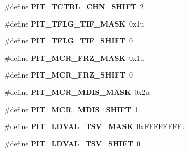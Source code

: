 \begin{DoxyCompactItemize}
\item 
\#define {\bfseries P\+I\+T\+\_\+\+T\+C\+T\+R\+L\+\_\+\+C\+H\+N\+\_\+\+S\+H\+I\+FT}~2\hypertarget{group__PIT__Register__Masks_ga9a1c8aa25a05c9b2c9503a003fa8d24d}{}\label{group__PIT__Register__Masks_ga9a1c8aa25a05c9b2c9503a003fa8d24d}

\item 
\#define {\bfseries P\+I\+T\+\_\+\+T\+F\+L\+G\+\_\+\+T\+I\+F\+\_\+\+M\+A\+SK}~0x1u\hypertarget{group__PIT__Register__Masks_ga9de8d708b43c9ca35df26c7b43f09769}{}\label{group__PIT__Register__Masks_ga9de8d708b43c9ca35df26c7b43f09769}

\item 
\#define {\bfseries P\+I\+T\+\_\+\+T\+F\+L\+G\+\_\+\+T\+I\+F\+\_\+\+S\+H\+I\+FT}~0\hypertarget{group__PIT__Register__Masks_gaf6f5ddca2193ed04bc61bc3e899f5ced}{}\label{group__PIT__Register__Masks_gaf6f5ddca2193ed04bc61bc3e899f5ced}

\item 
\#define {\bfseries P\+I\+T\+\_\+\+M\+C\+R\+\_\+\+F\+R\+Z\+\_\+\+M\+A\+SK}~0x1u\hypertarget{group__PIT__Register__Masks_ga8149a0bb21843632dd4528b540480ba7}{}\label{group__PIT__Register__Masks_ga8149a0bb21843632dd4528b540480ba7}

\item 
\#define {\bfseries P\+I\+T\+\_\+\+M\+C\+R\+\_\+\+F\+R\+Z\+\_\+\+S\+H\+I\+FT}~0\hypertarget{group__PIT__Register__Masks_ga500ccd29eaebc20aa853e7bbb23e3c0c}{}\label{group__PIT__Register__Masks_ga500ccd29eaebc20aa853e7bbb23e3c0c}

\item 
\#define {\bfseries P\+I\+T\+\_\+\+M\+C\+R\+\_\+\+M\+D\+I\+S\+\_\+\+M\+A\+SK}~0x2u\hypertarget{group__PIT__Register__Masks_ga024258b2c23ff75f3e161e56adbbe733}{}\label{group__PIT__Register__Masks_ga024258b2c23ff75f3e161e56adbbe733}

\item 
\#define {\bfseries P\+I\+T\+\_\+\+M\+C\+R\+\_\+\+M\+D\+I\+S\+\_\+\+S\+H\+I\+FT}~1\hypertarget{group__PIT__Register__Masks_ga7ddcd16550ff71e4ee5ac48022ae6fb6}{}\label{group__PIT__Register__Masks_ga7ddcd16550ff71e4ee5ac48022ae6fb6}

\item 
\#define {\bfseries P\+I\+T\+\_\+\+L\+D\+V\+A\+L\+\_\+\+T\+S\+V\+\_\+\+M\+A\+SK}~0x\+F\+F\+F\+F\+F\+F\+F\+Fu\hypertarget{group__PIT__Register__Masks_gab7929b3b8a0c170a50f57d97face5365}{}\label{group__PIT__Register__Masks_gab7929b3b8a0c170a50f57d97face5365}

\item 
\#define {\bfseries P\+I\+T\+\_\+\+L\+D\+V\+A\+L\+\_\+\+T\+S\+V\+\_\+\+S\+H\+I\+FT}~0\hypertarget{group__PIT__Register__Masks_ga463855d2b42de901bad9bea868f4f48b}{}\label{group__PIT__Register__Masks_ga463855d2b42de901bad9bea868f4f48b}


\end{DoxyCompactItemize}
